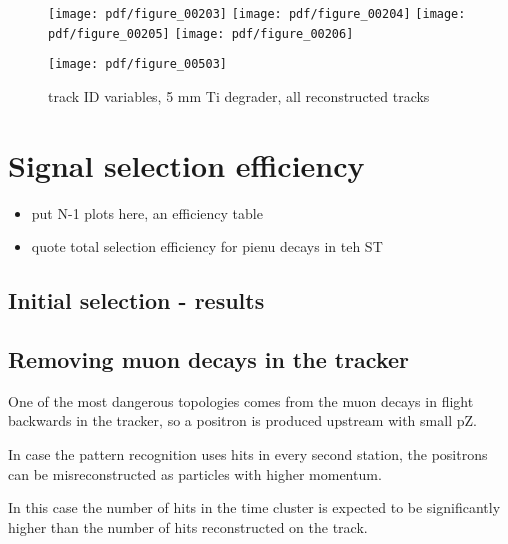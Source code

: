 \begin{figure}[H]
  \texttt{[image: pdf/figure\_00203]}
  \texttt{[image: pdf/figure\_00204]}
  \texttt{[image: pdf/figure\_00205]}
  \texttt{[image: pdf/figure\_00206]}
  \caption{
  }
\end{figure}

\begin{figure}[H]
  \texttt{[image: pdf/figure\_00503]}
  \caption{
    track ID variables, 5 mm Ti degrader, all reconstructed tracks
  }
\end{figure}


\section{Signal selection efficiency}

{\red
  \begin{itemize}
  \item 
    put N-1 plots here, an efficiency table
  \item
    quote total selection efficiency for pienu decays in teh ST
  \end{itemize}
}
\subsection{Initial selection - results}




\subsection{Removing muon decays in the tracker}

One of the most dangerous topologies comes from the muon decays in flight backwards in the tracker,
so a positron is produced upstream with small pZ.

In case the pattern recognition uses hits in every second station, the positrons can be misreconstructed
as particles with higher momentum.

In this case the number of hits in the time cluster is expected to be significantly higher
than the number of hits reconstructed on the track.

